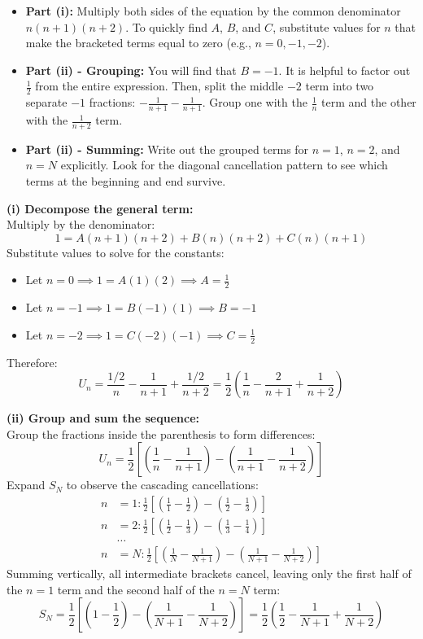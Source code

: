 \begin{hint}
\begin{itemize}
    \item \textbf{Part (i):} Multiply both sides of the equation by the common denominator $n(n+1)(n+2)$. To quickly find $A$, $B$, and $C$, substitute values for $n$ that make the bracketed terms equal to zero (e.g., $n=0, -1, -2$).
    \item \textbf{Part (ii) - Grouping:} You will find that $B = -1$. It is helpful to factor out $\frac{1}{2}$ from the entire expression. Then, split the middle $-2$ term into two separate $-1$ fractions: $-\frac{1}{n+1} - \frac{1}{n+1}$. Group one with the $\frac{1}{n}$ term and the other with the $\frac{1}{n+2}$ term.
    \item \textbf{Part (ii) - Summing:} Write out the grouped terms for $n=1$, $n=2$, and $n=N$ explicitly. Look for the diagonal cancellation pattern to see which terms at the beginning and end survive.
\end{itemize}
\end{hint}

\begin{solution}
\textbf{(i) Decompose the general term:} \\
Multiply by the denominator:
\[
1 = A(n+1)(n+2) + B(n)(n+2) + C(n)(n+1)
\]
Substitute values to solve for the constants:
\begin{itemize}
    \item Let $n = 0 \implies 1 = A(1)(2) \implies A = \frac{1}{2}$
    \item Let $n = -1 \implies 1 = B(-1)(1) \implies B = -1$
    \item Let $n = -2 \implies 1 = C(-2)(-1) \implies C = \frac{1}{2}$
\end{itemize}
Therefore:
\[
U_n = \frac{1/2}{n} - \frac{1}{n+1} + \frac{1/2}{n+2} = \frac{1}{2}\left(\frac{1}{n} - \frac{2}{n+1} + \frac{1}{n+2}\right)
\]

\textbf{(ii) Group and sum the sequence:} \\
Group the fractions inside the parenthesis to form differences:
\[
U_n = \frac{1}{2}\left[\left(\frac{1}{n} - \frac{1}{n+1}\right) - \left(\frac{1}{n+1} - \frac{1}{n+2}\right)\right]
\]
Expand $S_N$ to observe the cascading cancellations:
\begin{align*}
    n&=1: \frac{1}{2}\left[\left(\frac{1}{1} - \frac{1}{2}\right) - \left(\frac{1}{2} - \frac{1}{3}\right)\right] \\
    n&=2: \frac{1}{2}\left[\left(\frac{1}{2} - \frac{1}{3}\right) - \left(\frac{1}{3} - \frac{1}{4}\right)\right] \\
    &\dots \\
    n&=N: \frac{1}{2}\left[\left(\frac{1}{N} - \frac{1}{N+1}\right) - \left(\frac{1}{N+1} - \frac{1}{N+2}\right)\right]
\end{align*}
Summing vertically, all intermediate brackets cancel, leaving only the first half of the $n=1$ term and the second half of the $n=N$ term:
\[
S_N = \frac{1}{2}\left[\left(1 - \frac{1}{2}\right) - \left(\frac{1}{N+1} - \frac{1}{N+2}\right)\right] = \frac{1}{2}\left(\frac{1}{2} - \frac{1}{N+1} + \frac{1}{N+2}\right)
\]
\end{solution}

